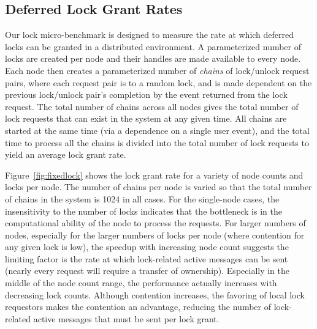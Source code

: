 \subsection{Deferred Lock Grant Rates}
\label{subsec:lockmicro}

Our lock micro-benchmark is designed to measure the rate at which deferred locks can be granted
in a distributed environment.
A parameterized number of locks are created per node and their handles are made available to
every node.  Each node then creates a parameterized number of {\em chains} of lock/unlock
request pairs, where each request pair is to a random lock, and is made dependent on the 
previous lock/unlock pair's completion by the event returned from the lock request.  
The total number of chains across all nodes gives the total
number of lock requests that can exist in the system at any given time.  All chains are
started at the same time (via a dependence on a single user event), and the total time to
process all the chains is divided into the total number of lock requests to yield an average
lock grant rate.


Figure~\ref{fig:fixedlock} shows the lock grant rate for a variety of node counts and locks
per node.  The number of chains per node is varied so that the total number of chains in the system
is 1024 in all cases.  For the single-node cases, the insensitivity to the number of locks indicates
that the bottleneck is in the computational ability of the node to process the requests. 
For larger numbers of nodes, especially for the larger numbers of locks per node (where contention
for any given lock is low), the speedup with increasing node count suggests the limiting factor is
the rate at which lock-related active messages can be sent (nearly every request will require a
transfer of ownership).  Especially in the middle of the node count range, the performance actually
increases with
decreasing lock counts.  Although contention increases, the favoring of local lock requestors makes
the contention an advantage, reducing the number of lock-related active messages that must be sent
per lock grant.


